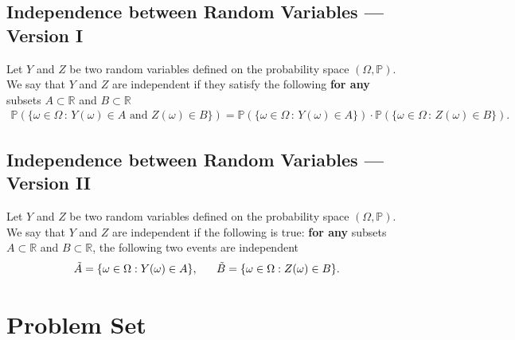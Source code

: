 \documentclass[11pt]{article}
\newcommand{\1}{\mathbb{1}}
\begin{document}
\subsection{Independence between Random Variables --- Version I}

Let $Y$ and $Z$ be two random variables defined on the probability space $(\Omega,\mathbb{P})$. We say that $Y$ and $Z$ are independent if they satisfy the following \textbf{for any} subsets $A\subset\mathbb{R}$ and $B\subset\mathbb{R}$
    \begin{align*}
       \boxed{ \mathbb{P}\left(\{\omega\in\Omega \,:\, Y(\omega)\in A \text{ and }Z(\omega)\in B\}\right) = \mathbb{P}\left(\{\omega\in\Omega \,:\, Y(\omega)\in A \}\right) \cdot \mathbb{P}\left(\{\omega\in\Omega \,:\, Z(\omega)\in B\}\right).}
    \end{align*}

\subsection{Independence between Random Variables --- Version II}

Let $Y$ and $Z$ be two random variables defined on the probability space $(\Omega,\mathbb{P})$. We say that $Y$ and $Z$ are independent if the following is true: \textbf{for any} subsets $A\subset \mathbb{R}$ and $B\subset \mathbb{R}$, the following two events are independent
    \begin{align*}
        \Tilde{A}=\{\omega\in\Omega: Y(\omega)\in A\},\ \ \ \ \ \Tilde{B}=\{\omega\in\Omega: Z(\omega)\in B\}.
    \end{align*}

\section{Problem Set}
\end{document}
